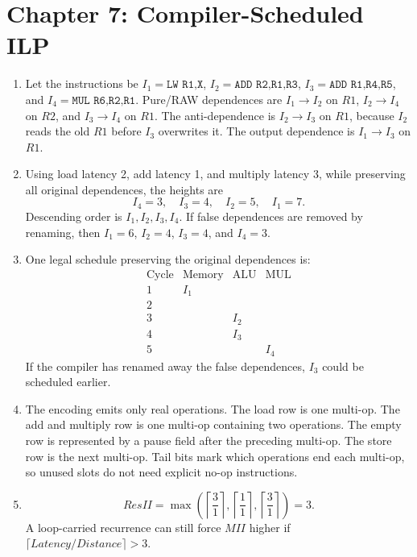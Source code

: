 \documentclass[11pt]{article}
\begin{document}
\section{Chapter 7: Compiler-Scheduled ILP}
\begin{enumerate}
    \item Let the instructions be \(I_1=\texttt{LW R1,X}\), \(I_2=\texttt{ADD R2,R1,R3}\), \(I_3=\texttt{ADD R1,R4,R5}\), and \(I_4=\texttt{MUL R6,R2,R1}\).
    Pure/RAW dependences are \(I_1\rightarrow I_2\) on \(R1\), \(I_2\rightarrow I_4\) on \(R2\), and \(I_3\rightarrow I_4\) on \(R1\).
    The anti-dependence is \(I_2\rightarrow I_3\) on \(R1\), because \(I_2\) reads the old \(R1\) before \(I_3\) overwrites it.
    The output dependence is \(I_1\rightarrow I_3\) on \(R1\).

    \item Using load latency 2, add latency 1, and multiply latency 3, while preserving all original dependences, the heights are
    \[
        I_4=3,\quad I_3=4,\quad I_2=5,\quad I_1=7.
    \]
    Descending order is \(I_1, I_2, I_3, I_4\).
    If false dependences are removed by renaming, then \(I_1=6\), \(I_2=4\), \(I_3=4\), and \(I_4=3\).

    \item One legal schedule preserving the original dependences is:
    \[
    \begin{array}{c|c|c|c}
        \text{Cycle} & \text{Memory} & \text{ALU} & \text{MUL}\\
        \hline
        1 & I_1 & &\\
        2 & & &\\
        3 & & I_2 &\\
        4 & & I_3 &\\
        5 & & & I_4
    \end{array}
    \]
    If the compiler has renamed away the false dependences, \(I_3\) could be scheduled earlier.

    \item The encoding emits only real operations.
    The load row is one multi-op.
    The add and multiply row is one multi-op containing two operations.
    The empty row is represented by a pause field after the preceding multi-op.
    The store row is the next multi-op.
    Tail bits mark which operations end each multi-op, so unused slots do not need explicit no-op instructions.

    \item
    \[
        ResII=\max\left(\left\lceil\frac{3}{1}\right\rceil,
        \left\lceil\frac{1}{1}\right\rceil,
        \left\lceil\frac{3}{1}\right\rceil\right)=3.
    \]
    A loop-carried recurrence can still force \(MII\) higher if \(\lceil Latency/Distance\rceil>3\).


\end{enumerate}
\end{document}

